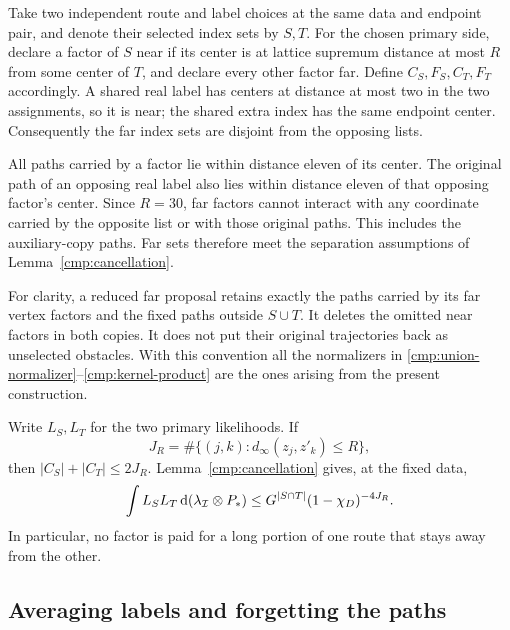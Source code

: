 Take two independent route and label choices at the same data and endpoint
pair, and denote their selected index sets by $S,T$. For the chosen primary
side, declare a factor of $S$ near if its center is at lattice supremum
distance at most $R$ from some center of $T$, and declare every other factor
far. Define $C_S,F_S,C_T,F_T$ accordingly. A shared real label has centers
at distance at most two in the two assignments, so it is near; the shared
extra index has the same endpoint center. Consequently the far index sets
are disjoint from the opposing lists.

All paths carried by a factor lie within distance eleven of its center.
The original path of an opposing real label also lies within distance eleven
of that opposing factor's center. Since $R=30$, far factors cannot interact
with any coordinate carried by the opposite list or with those original
paths. This includes the auxiliary-copy paths. Far sets therefore meet the
separation assumptions of Lemma~\ref{cmp:cancellation}.

For clarity, a reduced far proposal retains exactly the paths carried by
its far vertex factors and the fixed paths outside $S\cup T$. It deletes
the omitted near factors in both copies. It does not put their original
trajectories back as unselected obstacles. With this convention all the
normalizers in \eqref{cmp:union-normalizer}--\eqref{cmp:kernel-product}
are the ones arising from the present construction.

Write $L_S,L_T$ for the two primary likelihoods. If
\[
 J_R=\#\{(j,k):d_\infty(z_j,z'_k)\le R\},
\]
then $|C_S|+|C_T|\le2J_R$. Lemma~\ref{cmp:cancellation} gives, at the
fixed data,
\begin{equation}\label{cmp:two-choice-bound}
 \int L_SL_T\,\mathrm d(\lambda_{\mathcal I}\otimes P_*)
 \le G^{|S\cap T|}(1-\chi_D)^{-4J_R}.
\end{equation}
In particular, no factor is paid for a long portion of one route that stays
away from the other.

\subsection{Averaging labels and forgetting the paths}

